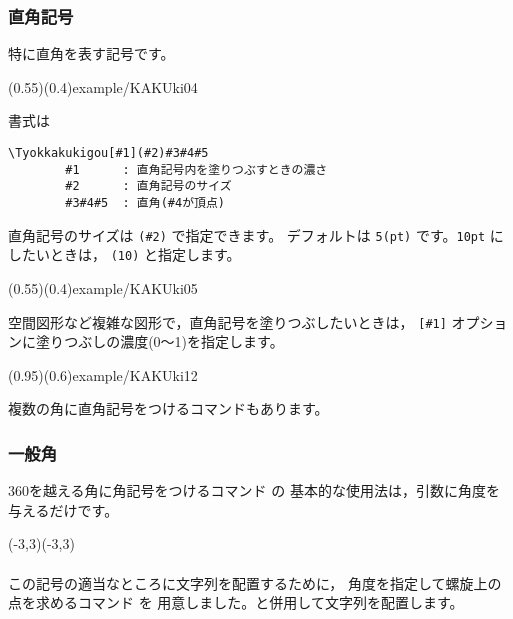 \subsubsection{直角記号}
特に直角を表す記号です。

(0.55)(0.4){example/KAKUki04}

書式は

\begin{boxnote}
\begin{verbatim}
\Tyokkakukigou[#1](#2)#3#4#5
        #1      : 直角記号内を塗りつぶすときの濃さ
        #2      : 直角記号のサイズ
        #3#4#5  : 直角(#4が頂点)
\end{verbatim}
\end{boxnote}

直角記号のサイズは \verb+(#2)+ で指定できます。
デフォルトは \texttt{5(pt)} です。\texttt{10pt} にしたいときは，
\texttt{(10)} と指定します。

(0.55)(0.4){example/KAKUki05}

空間図形など複雑な図形で，直角記号を塗りつぶしたいときは，
\verb/[#1]/ オプションに塗りつぶしの濃度(0〜1)を指定します。

(0.95)(0.6){example/KAKUki12}

複数の角に直角記号をつけるコマンドもあります。

\subsubsection{一般角}
360\Deg を越える角に角記号をつけるコマンド  の
基本的な使用法は，引数に角度を与えるだけです。

\begin{showEx}{}
\small
\begin{zahyou}(-3,3)(-3,3)%
%
%
\end{zahyou}
\end{showEx}
\bigskip

\paragraph{}
この記号の適当なところに文字列を配置するために，
角度を指定して螺旋上の点を求めるコマンド  を
用意しました。と併用して文字列を配置します。

